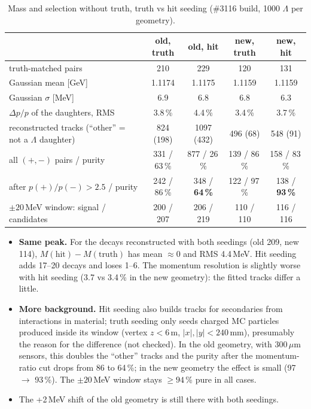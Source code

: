 \documentclass[11pt,a4paper]{article}
\begin{document}
\begin{table}[H]
\centering
\caption{Mass and selection without truth, truth vs hit seeding (\#3116 build, 1000 $\Lambda$ per geometry).}
\setlength{\tabcolsep}{4pt}
\begin{tabular}{@{}lcccc@{}}
\toprule
& old, truth & old, hit & new, truth & new, hit\\
\midrule
truth-matched pairs & 210 & 229 & 120 & 131\\
Gaussian mean [GeV] & 1.1174 & 1.1175 & 1.1159 & 1.1159\\
Gaussian $\sigma$ [MeV] & 6.9 & 6.8 & 6.8 & 6.3\\
$\Delta p/p$ of the daughters, RMS & 3.8\,\% & 4.4\,\% & 3.4\,\% & 3.7\,\%\\
\midrule
reconstructed tracks (``other'' = not a $\Lambda$ daughter) & 824 (198) & 1097 (432) & 496 (68) & 548 (91)\\
all $(+,-)$ pairs / purity & 331 / 63\,\% & 877 / 26\,\% & 139 / 86\,\% & 158 / 83\,\%\\
after $p(+)/p(-) > 2.5$ / purity & 242 / 86\,\% & 348 / \textbf{64\,\%} & 122 / 97\,\% & 138 / \textbf{93\,\%}\\
$\pm 20$\,MeV window: signal / candidates & 200 / 207 & 206 / 219 & 110 / 110 & 116 / 116\\
\bottomrule
\end{tabular}
\end{table}

\begin{itemize}
\item \textbf{Same peak.} For the decays reconstructed with both seedings (old 209, new 114),
$M(\text{hit}) - M(\text{truth})$ has mean $\approx 0$ and RMS 4.4\,MeV. Hit seeding adds 17--20
decays and loses 1--6. The momentum resolution is slightly worse with hit seeding (3.7 vs 3.4\,\%
in the new geometry): the fitted tracks differ a little.
\item \textbf{More background.} Hit seeding also builds tracks for secondaries from interactions in
material; truth seeding only seeds charged MC particles produced inside its window (vertex
$z < 6$\,m, $|x|,|y| < 240$\,mm), presumably the reason for the difference (not checked). In the
old geometry, with 300\,$\mu$m sensors, this doubles the ``other'' tracks and the purity after the
momentum-ratio cut drops from 86 to 64\,\%; in the new geometry the effect is small (97 $\to$
93\,\%). The $\pm 20$\,MeV window stays $\ge 94$\,\% pure in all cases.
\item The +2\,MeV shift of the old geometry is still there with both seedings.
\end{itemize}
\end{document}
